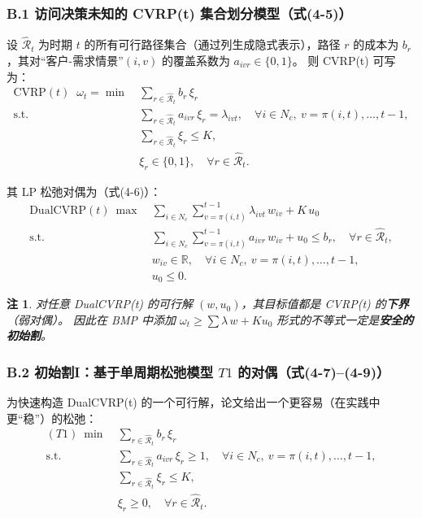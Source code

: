 \documentclass{article}
\newtheorem{remark}{注}
\begin{document}
\subsubsection*{B.1 访问决策未知的 CVRP(t) 集合划分模型（式(4-5)）}

设 $\hat{\mathcal R}_t$ 为时期 $t$ 的所有可行路径集合（通过列生成隐式表示），路径 $r$ 的成本为 $b_r$，其对“客户-需求情景”$(i,v)$ 的覆盖系数为 $a_{ivr}\in\{0,1\}$。
则 CVRP(t) 可写为：
\begin{equation}
\begin{aligned}
\text{CVRP}(t)\;\; \omega_t=\min\ &\sum_{r\in\hat{\mathcal R}_t} b_r\,\xi_r\\
\text{s.t.}\ &\sum_{r\in\hat{\mathcal R}_t} a_{ivr}\,\xi_r=\lambda_{ivt},\quad \forall i\in N_c,\ v=\pi(i,t),\dots,t-1,\\
&\sum_{r\in\hat{\mathcal R}_t}\xi_r\le K,\\
&\xi_r\in\{0,1\},\quad \forall r\in\hat{\mathcal R}_t.
\end{aligned}
\label{eq:cvrp_sp_45}
\end{equation}

其 LP 松弛对偶为（式(4-6)）：
\begin{equation}
\begin{aligned}
\text{DualCVRP}(t)\ \max\ &\sum_{i\in N_c}\sum_{v=\pi(i,t)}^{t-1} \lambda_{ivt}\,w_{iv}+K\,u_0\\
\text{s.t.}\ &\sum_{i\in N_c}\sum_{v=\pi(i,t)}^{t-1} a_{ivr}\,w_{iv}+u_0\le b_r,\quad \forall r\in\hat{\mathcal R}_t,\\
&w_{iv}\in\mathbb R,\quad \forall i\in N_c,\ v=\pi(i,t),\dots,t-1,\\
&u_0\le 0.
\end{aligned}
\label{eq:dual_cvrp_46}
\end{equation}

\begin{remark}
对任意 DualCVRP(t) 的可行解 $(w,u_0)$，其目标值都是 CVRP(t) 的\textbf{下界}（弱对偶）。
因此在 BMP 中添加 $\omega_t\ge \sum \lambda\,w+K u_0$ 形式的不等式一定是\textbf{安全的初始割}。
\end{remark}

\subsubsection*{B.2 初始割I：基于单周期松弛模型 $T1$ 的对偶（式(4-7)--(4-9)）}

为快速构造 DualCVRP(t) 的一个可行解，论文给出一个更容易（在实践中更“稳”）的松弛：
\begin{equation}
\begin{aligned}
(T1)\ \min\ &\sum_{r\in\hat{\mathcal R}_t} b_r\,\xi_r\\
\text{s.t.}\ &\sum_{r\in\hat{\mathcal R}_t} a_{ivr}\,\xi_r\ge 1,\quad \forall i\in N_c,\ v=\pi(i,t),\dots,t-1,\\
&\sum_{r\in\hat{\mathcal R}_t}\xi_r\le K,\\
&\xi_r\ge 0,\quad \forall r\in\hat{\mathcal R}_t.
\end{aligned}
\label{eq:t1_primal_47}
\end{equation}
\end{document}
